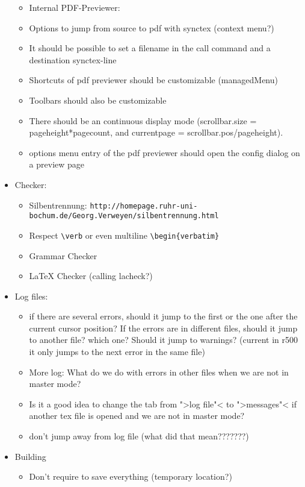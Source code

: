 \documentclass[10pt,a4paper,landscape]{report}
\begin{document}
\begin{itemize}
\begin{itemize}
	\item Internal PDF-Previewer:
	\item Options to jump from source to pdf with synctex (context menu?)
	\item It should be possible to set a filename in the call command and a destination synctex-line
	\item Shortcuts of pdf previewer should be customizable (managedMenu)
	\item Toolbars should also be customizable
	\item There should be an continuous display mode (scrollbar.size = pageheight*pagecount, and currentpage = scrollbar.pos/pageheight).
	\item options menu entry of the pdf previewer should open the config dialog on a preview page
	\end{itemize}
	\item  Checker: \begin{itemize}
		\item Silbentrennung: \verb+http://homepage.ruhr-uni-bochum.de/Georg.Verweyen/silbentrennung.html+
		\item Respect \verb+\verb+ or even multiline \verb+\begin{verbatim}+
		\item Grammar Checker
		\item LaTeX Checker	(calling lacheck?)
	\end{itemize}
	\item Log files:\begin{itemize}
	\item if there are several errors, should it jump to the first or the one after the current cursor position? If the errors are in different files, should it jump to another file? which one? Should it jump to warnings? 	(current in r500 it only jumps to the next error in the same file) 
		\item More log: What do we do with errors in other files when we are not in master mode? 
		\item Is it a good idea to change the tab from ">log file"< to ">messages"< if another tex file is opened and we are not in master mode?
		\item don't jump away from log file (what did that mean???????)
	\end{itemize}
	\item Building \begin{itemize}
		\item Don't require to save everything (temporary location?)

\end{itemize}
\end{itemize}
\end{document}
